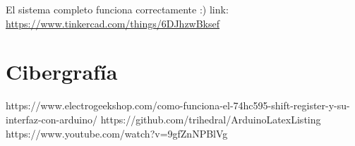 \documentclass{article}
\begin{document}
\newline El sistema completo funciona correctamente :)
\newline link: \url{https://www.tinkercad.com/things/6DJhzwBksef}

\newpage
\section{Cibergrafía} \label{ciber}

https://www.electrogeekshop.com/como-funciona-el-74hc595-shift-register-y-su-interfaz-con-arduino/
\newline
https://github.com/trihedral/ArduinoLatexListing
\newline
https://www.youtube.com/watch?v=9gfZnNPBlVg
\end{document}
